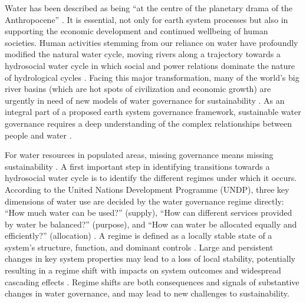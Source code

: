 \label{Intro.}
Water has been described as being ``at the centre of the planetary drama of the Anthropocene''
\cite{gleesonIlluminatingwatercycle2020}.
It is essential, not only for earth system processes but also in supporting the economic development and continued wellbeing of human societies. Human activities stemming from our reliance on water have profoundly modified the natural water cycle, moving rivers along a trajectory towards a hydrosocial water cycle in which social and power relations dominate the nature of hydrological cycles
\cite{gleesonIlluminatingwatercycle2020,sivapalanSociohydrologynewscience2012,qinTheoreticalframeworkdualistic2014,abbottwatercycleAnthropocene2019,leviaHomogenizationterrestrialwater2020}.
Facing this major transformation, many of the world’s big river basins (which are hot spots of civilization and economic growth) are urgently in need of new models of water governance for sustainability
\cite{bestAnthropogenicstressesworld2019,falkenmarkUnderstandingwaterresilience2019,dibaldassarreSociohydrologyScientificChallenges2019}.
As an integral part of a proposed earth system governance framework, sustainable water governance requires a deep understanding of the complex relationships between people and water
\cite{dibaldassarreSociohydrologyScientificChallenges2019,biermannNavigatingAnthropoceneImproving2012,steffenemergenceevolutionEarth2020}.

For water resources in populated areas, missing governance means missing sustainability
\cite{undpwatergovernancefacilityWaterGovernanceIssue}.
A first important step in identifying transitions towards a hydrosocial water cycle is to identify the different regimes under which it occurs.
According to the United Nations Development Programme (UNDP), three key dimensions of water use are decided by the water governance regime directly: ``How much water can be used?'' (supply), ``How can different services provided by water be balanced?'' (purpose), and ``How can water be allocated equally and efficiently?'' (allocation)
\cite{undpwatergovernancefacilityWaterGovernanceIssue, mariajacobsonUserguideassessing2013, kjellenWatergovernanceperspective2015}.
A regime is defined as a locally stable state of a system’s structure, function, and dominant controls
\cite{carpenterEarlyWarningsRegime2011}.
Large and persistent changes in key system properties may lead to a loss of local stability, potentially resulting in a regime shift with impacts on system outcomes and widespread cascading effects
\cite{rochaCascadingregimeshifts2018, gregrCascadingsocialecologicalcosts2020}.
Regime shifts are both consequences and signals of substantive changes in water governance, and may lead to new challenges to sustainability.

